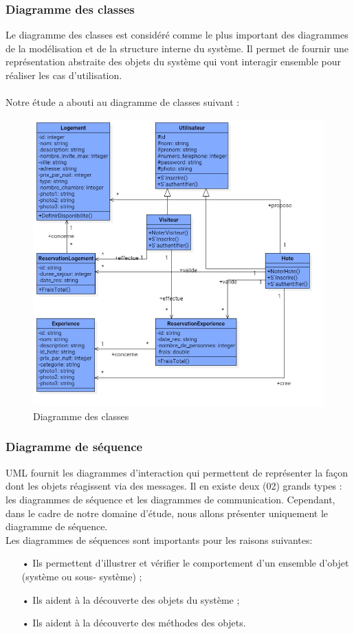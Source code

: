 \subsubsection{Diagramme des classes} 
Le diagramme des classes est considéré comme le plus important des diagrammes de la modélisation et de la structure interne du système. Il permet de fournir une représentation abstraite des objets du système qui vont interagir ensemble pour réaliser les cas d’utilisation.
\\$ $\\Notre étude a abouti au diagramme de classes suivant :
\begin{figure}[H]
	\begin{center}
		\includegraphics[width=18cm]{images/uml/ClassDiagram.jpg}
	\end{center}
	\caption{Diagramme des classes}
\end{figure}

\subsubsection{Diagramme de séquence} 
UML fournit les diagrammes d’interaction qui permettent de représenter la façon dont les objets réagissent via des messages. Il en existe deux (02) grands types : les diagrammes de séquence et les diagrammes de communication. Cependant, dans le cadre de notre domaine d’étude, nous allons présenter uniquement le diagramme de séquence.
\\Les diagrammes de séquences sont importants pour les raisons suivantes:
\begin{itemize}
\item[•] Ils permettent d'illustrer et vérifier le comportement d’un ensemble d’objet (système ou sous- système) ;
\item[•] Ils aident à la découverte des objets du système ;
\item[•] Ils aident à la découverte des méthodes des objets.
\end{itemize}

